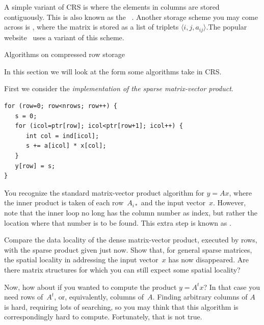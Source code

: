 A simple variant of \ac{CRS} is  where the elements in columns
are stored contiguously. This is also known as the
~\cite{Duff:harwellboeingformat}.
Another storage scheme you may come across is
, where the matrix is stored as a list
of triplets $\langle i,j,a_{ij}\rangle$.The popular 
website~\cite{matrix-market} uses a variant of this scheme.

 {Algorithms on compressed row storage}
\label{sec:crs-mvp}

In this section we will look at the form
some algorithms take in \ac{CRS}.

First we consider the \emph{implementation of the sparse matrix-vector
  product}.
\begin{verbatim}
for (row=0; row<nrows; row++) {
   s = 0;
   for (icol=ptr[row]; icol<ptr[row+1]; icol++) {
      int col = ind[icol];
      s += a[icol] * x[col];
   }
   y[row] = s;
}
\end{verbatim}
You recognize the standard matrix-vector product algorithm for $y=Ax$,
where the inner product is taken of each row~$A_{i*}$ and the input
vector~$x$. However, note that the inner loop no long has the column
number as index, but rather the location where that number is to be
found. This extra step is known as .

\begin{exercise}
  Compare the data locality of the dense matrix-vector product, executed by rows,
  with the sparse product given just now. Show that, for general sparse matrices,
  the spatial locality in addressing
  the input vector~$x$ has now disappeared. Are there matrix structures for which
  you can still expect some spatial locality?
\end{exercise}

Now, how about if you wanted to compute the product $y=A^tx$? In that
case you need rows of~$A^t$, or, equivalently, columns of~$A$. Finding
arbitrary columns of $A$ is hard, requiring lots of searching, so you may
think that this algorithm is correspondingly hard to
compute. Fortunately, that is not true.

